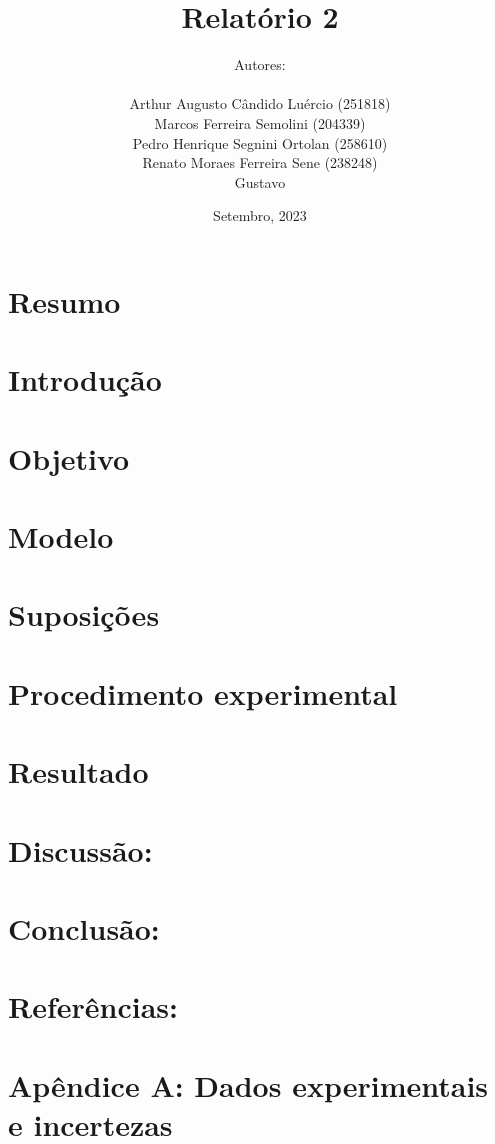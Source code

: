 \documentclass[10pt, letterpaper]{article}
\title{\huge
{\textbf{Relatório 2}}
 \\
\fontsize{30pt}{36pt}\selectfont{\textbf{O Pêndulo Físico}}
}
\author{
Autores:\\ \ \\
Arthur Augusto Cândido Luércio (251818) \\
Marcos Ferreira Semolini (204339) \\
Pedro Henrique Segnini Ortolan (258610) \\
Renato Moraes Ferreira Sene (238248) \\
Gustavo
}
\date{Setembro, 2023}
\begin{document}
\pagestyle{fancy}
\fancyfoot{}\fancyhead{}
\maketitle{}
\pagebreak
{}
\fancyfoot[R]{\thepage}
\section*{Resumo}
\section*{Introdução}
\section*{Objetivo}
\section*{Modelo}
\section*{Suposições}
\section*{Procedimento experimental}
\section*{Resultado}
\section*{Discussão:}
\section*{Conclusão:}
\section*{Referências:}
\section*{Apêndice A: Dados experimentais e incertezas}
\end{document}
